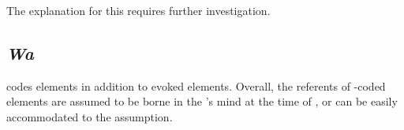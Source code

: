 The explanation for this requires further investigation.

 







\subsection{\textit{Wa}}\label{Wa}

 codes  elements in addition to evoked elements.
Overall, the referents of -coded elements are assumed to be
borne in the 's mind at the time of ,
or can be easily accommodated to the assumption.


